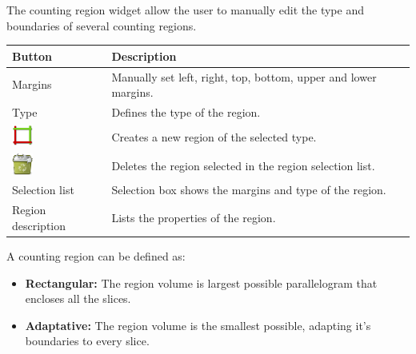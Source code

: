 The counting region widget allow the user to manually edit the type and boundaries of several
counting regions.\\

\begin{tabular}{| m{1.3cm} | m{12cm} |}
\hline
\textbf{Button} & \textbf{Description}\\
\hline
Margins & Manually set left, right, top, bottom, upper and lower margins.\\
\hline
Type & Defines the type of the region.\\
\hline
\includegraphics[width=0.7cm]{../../plugins/CountingRegion/rsc/apply} & Creates a new region of the selected type.\\
\hline
\includegraphics[width=0.7cm]{../../plugins/CountingRegion/rsc/trash-full} & Deletes the region selected in the region selection list.\\
\hline
Selection list & Selection box shows the margins and type of the region.\\
\hline
Region description & Lists the properties of the region.\\
\hline
\end{tabular}
\vspace{0.3cm} 

A counting region can be defined as:
\begin{itemize}
\item \textbf{Rectangular:} The region volume is largest possible parallelogram that encloses all the slices.
\item \textbf{Adaptative:} The region volume is the smallest possible, adapting it's boundaries to every slice.
\end{itemize}

